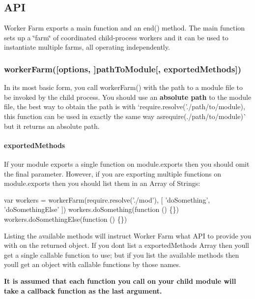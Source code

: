 \subsection*{A\+PI}

Worker Farm exports a main function and an {\ttfamily end()} method. The main function sets up a \char`\"{}farm\char`\"{} of coordinated child-\/process workers and it can be used to instantiate multiple farms, all operating independently.

\subsubsection*{worker\+Farm(\mbox{[}options, \mbox{]}path\+To\+Module\mbox{[}, exported\+Methods\mbox{]})}

In its most basic form, you call {\ttfamily worker\+Farm()} with the path to a module file to be invoked by the child process. You should use an {\bfseries absolute path} to the module file, the best way to obtain the path is with `require.\+resolve('./path/to/module\textquotesingle{}){\ttfamily , this function can be used in exactly the same way as}require(\textquotesingle{}./path/to/module\textquotesingle{})\`{} but it returns an absolute path.

\paragraph*{{\ttfamily exported\+Methods}}

If your module exports a single function on {\ttfamily module.\+exports} then you should omit the final parameter. However, if you are exporting multiple functions on {\ttfamily module.\+exports} then you should list them in an Array of Strings\+:


\begin{DoxyCode}
var workers = workerFarm(require.resolve('./mod'), [ 'doSomething', 'doSomethingElse' ])
workers.doSomething(function () \{\})
workers.doSomethingElse(function () \{\})
\end{DoxyCode}


Listing the available methods will instruct Worker Farm what A\+PI to provide you with on the returned object. If you don\textquotesingle{}t list a {\ttfamily exported\+Methods} Array then you\textquotesingle{}ll get a single callable function to use; but if you list the available methods then you\textquotesingle{}ll get an object with callable functions by those names.

{\bfseries It is assumed that each function you call on your child module will take a {\ttfamily callback} function as the last argument.}

